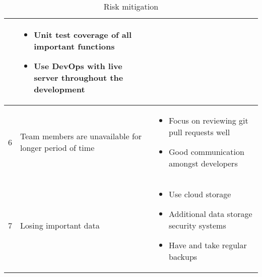 \begin{table}[H]
{\begin{tabular}{|c|l|p{10cm}|}
    &\begin{itemize}
        \item Unit test coverage of all important functions
        \item Use DevOps with live server throughout the development
    \end{itemize} \\
    \hline
    6 & Team members are unavailable for longer period of time
    &\begin{itemize}
        \item Focus on reviewing git pull requests well
        \item Good communication amongst developers
    \end{itemize}\\
    \hline
    7 & Losing important data
    &\begin{itemize}
        \item Use cloud storage
        \item Additional data storage security systems
        \item Have and take regular backups
    \end{itemize}\\
    \hline
    
\end{tabular}
}
\caption{Risk mitigation}
\label{riskMitigation}
\end{table}